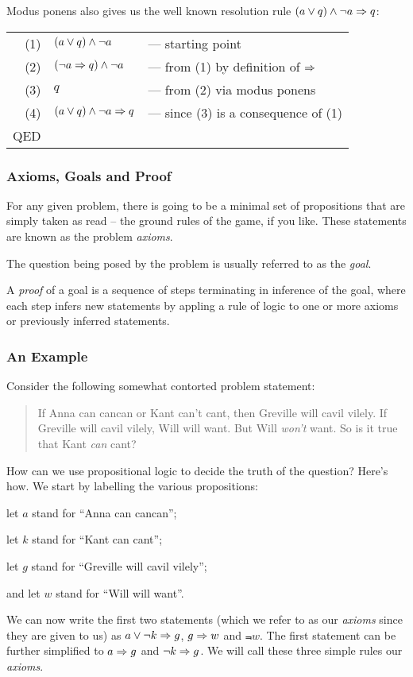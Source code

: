 Modus ponens also gives us the well known resolution rule
$(a \vee q) \wedge \neg{}a \Rightarrow q$:
\begin{tabular}{rll}
(1) & $(a \vee q) \wedge \neg{}a$
& --- starting point \\
(2) & $(\neg{}a \Rightarrow q) \wedge \neg{}a$
& --- from (1) by definition of $\Rightarrow$ \\
(3) & $q$
& --- from (2) via modus ponens \\
(4) & $(a \vee q) \wedge \neg{}a \Rightarrow q$
& --- since (3) is a consequence of (1) \\
QED \\
\end{tabular}

\subsubsection{Axioms, Goals and Proof}

For any given problem, there is going to be a minimal set of
propositions that are simply taken as read -- the ground rules of the
game, if you like.  These statements are known as the problem
\emph{axioms}.

The question being posed by the problem is usually referred to as the
\emph{goal}.

A \emph{proof} of a goal is a sequence of steps terminating in inference
of the goal, where each step infers new statements by appling a rule of
logic to one or more axioms or previously inferred statements.

\subsubsection{An Example}


Consider the following somewhat contorted problem statement:
\begin{quote}
If Anna can cancan or Kant can't cant, then Greville will cavil vilely.
If Greville will cavil vilely, Will will want.  But
Will \emph{won't} want.  So is it true that Kant \emph{can} cant?
\end{quote}
How can we use propositional logic to decide the truth of the question?
Here's how.  We start by labelling the various propositions:
\begin{description}
\item let $a$ stand for ``Anna can cancan'';
\item let $k$ stand for ``Kant can cant'';
\item let $g$ stand for ``Greville will cavil vilely'';
\item and let $w$ stand for ``Will will want''.
\end{description}
We can now write the first two statements (which we refer to as our
\emph{axioms} since they are given to us) as $a \vee \neg{}k \Rightarrow g$,
$g \Rightarrow w$ and $\Not{w}$.  The first statement can be further simplified to
$a \Rightarrow g$ and $\neg{}k \Rightarrow g$.  We will call these three simple rules our
\emph{axioms}.

